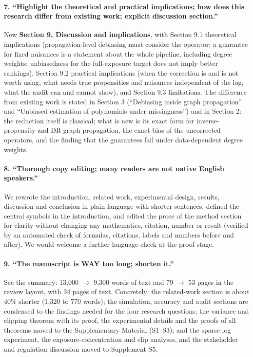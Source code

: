 \documentclass[11pt]{article}
\begin{document}
\paragraph{7. ``Highlight the theoretical and practical implications; how does this research differ from existing work; explicit discussion section.''}
New \textbf{Section 9, Discussion and implications}, with Section 9.1 theoretical implications
(propagation-level debiasing must consider the operator; a guarantee for fixed nuisances is a statement
about the whole pipeline, including degree weights; unbiasedness for the full-exposure target does not imply
better rankings), Section 9.2 practical implications (when the correction is and is not worth using, what
needs true propensities and nuisances independent of the log, what the audit can and cannot show), and Section
9.3 limitations. The difference from existing work is stated in Section 3 (``Debiasing inside graph
propagation'' and ``Unbiased estimation of polynomials under missingness'') and in Section 2: the reduction itself is classical;
what is new is its exact form for inverse-propensity and DR graph propagation, the exact bias of the
uncorrected operators, and the finding that the guarantees fail under data-dependent degree weights.

\paragraph{8. ``Thorough copy editing; many readers are not native English speakers.''}
We rewrote the introduction, related work, experimental design, results, discussion and conclusion in plain
language with shorter sentences, defined the central symbols in the introduction, and edited the prose of the method section
for clarity without changing any mathematics, citation, number or result (verified by an automated check of
formulas, citations, labels and numbers before and after). We would welcome a further language check at
the proof stage.

\paragraph{9. ``The manuscript is WAY too long; shorten it.''}
See the summary: 13{,}000 $\to$ 9{,}300 words of text and 79 $\to$ 53 pages in the review layout, with 34 pages of
text. Concretely: the related-work section is about 40\% shorter (1{,}320 to 770 words); the simulation, accuracy and audit
sections are condensed to the findings needed for the four research questions; the variance and clipping theorem
with its proof, the experimental details and the proofs of all theorems moved to the Supplementary Material (S1--S3);
and the sparse-log experiment, the exposure-concentration and clip analyses, and the stakeholder and regulation discussion
moved to Supplement S5.
\end{document}
